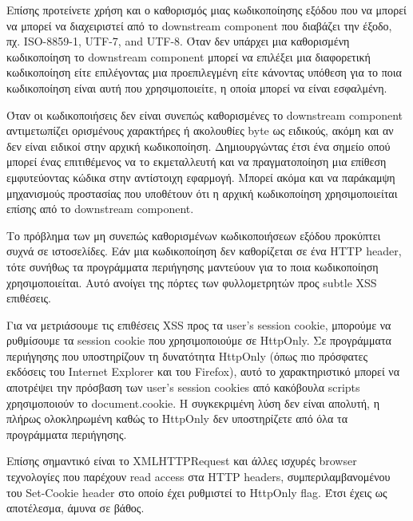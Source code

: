 \noindent
Επίσης προτείνετε χρήση και ο καθορισμός μιας κωδικοποίησης εξόδου που να μπορεί να μπορεί να διαχειριστεί από το downstream component που διαβάζει την έξοδο, πχ. ISO-8859-1, UTF-7, and UTF-8. Όταν δεν υπάρχει μια καθορισμένη κωδικοποίηση το downstream component μπορεί να επιλέξει μια διαφορετική κωδικοποίηση είτε επιλέγοντας μια προεπιλεγμένη είτε κάνοντας υπόθεση για το ποια κωδικοποίηση είναι αυτή που χρησιμοποιείτε, η οποία μπορεί να είναι εσφαλμένη.

\noindent
Όταν οι κωδικοποιήσεις δεν είναι συνεπώς καθορισμένες το downstream component αντιμετωπίζει ορισμένους χαρακτήρες ή ακολουθίες byte ως ειδικούς, ακόμη και αν δεν είναι ειδικοί στην αρχική κωδικοποίηση. Δημιουργώντας έτσι ένα σημείο οπού μπορεί ένας επιτιθέμενος να το εκμεταλλευτή και να πραγματοποίηση μια επίθεση εμφυτεύοντας κώδικα στην αντίστοιχη εφαρμογή. Μπορεί ακόμα και να παράκαμψη μηχανισμούς προστασίας που υποθέτουν ότι η αρχική κωδικοποίηση χρησιμοποιείται επίσης από το downstream component.

\noindent
Το πρόβλημα των μη συνεπώς καθορισμένων κωδικοποιήσεων εξόδου προκύπτει συχνά σε ιστοσελίδες. Εάν μια κωδικοποίηση δεν καθορίζεται σε ένα HTTP header, τότε συνήθως τα προγράμματα περιήγησης μαντεύουν για το ποια κωδικοποίηση χρησιμοποιείται. Αυτό ανοίγει της πόρτες των φυλλομετρητών προς subtle XSS επιθέσεις.

\noindent
Για να μετριάσουμε τις επιθέσεις XSS προς τα user's session cookie, μπορούμε να ρυθμίσουμε τα session cookie που χρησιμοποιούμε σε HttpOnly. Σε προγράμματα περιήγησης που υποστηρίζουν τη δυνατότητα HttpOnly (όπως πιο πρόσφατες εκδόσεις του Internet Explorer και του Firefox), αυτό το χαρακτηριστικό μπορεί να αποτρέψει την πρόσβαση των user's session cookies από κακόβουλα scripts χρησιμοποιούν το document.cookie. Η συγκεκριμένη λύση δεν είναι απολυτή, η πλήρως ολοκληρωμένη καθώς το HttpOnly δεν υποστηρίζετε από όλα τα προγράμματα περιήγησης.

\noindent
Επίσης σημαντικό είναι το XMLHTTPRequest και άλλες ισχυρές browser τεχνολογίες που παρέχουν read access στα HTTP headers, συμπεριλαμβανομένου του Set-Cookie header στο οποίο έχει ρυθμιστεί το HttpOnly flag. Έτσι έχεις ως αποτέλεσμα, άμυνα σε βάθος.
